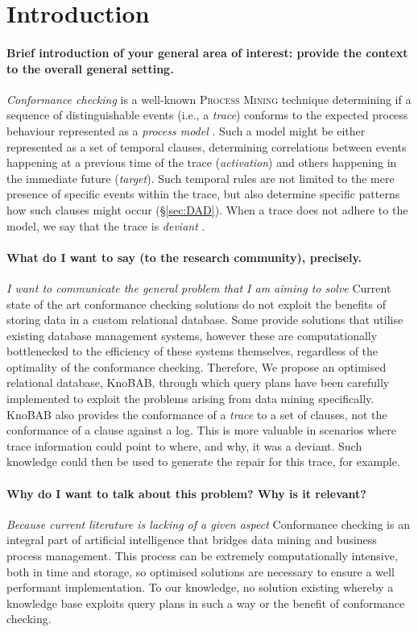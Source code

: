 \section{Introduction}

\paragraph*{Brief introduction of your general area of interest: provide the \textbf{context} to the overall general setting.}
\textit{Conformance checking} is a well-known \textsc{Process Mining} technique determining if a sequence of distinguishable events (i.e., a \textit{trace}) conforms to the expected process behaviour represented as a \textit{process model} \cite{RozinatA08}. Such a model might be either represented as a set of temporal clauses, determining correlations between events happening at a previous time of the trace (\textit{activation}) and others happening in the immediate future (\textit{target}). Such temporal rules are not limited to the mere presence of specific events within the trace, but also determine specific patterns how such clauses might occur (\S\ref{sec:DAD}). When a trace does not adhere to the model, we say that the trace is \textit{deviant} \cite{bpm21}.
\medskip

\paragraph*{What do I want to say (to the research community), precisely.} \textit{I want to communicate the general problem that I am aiming to solve} Current state of the art conformance checking solutions do not exploit the benefits of storing data in a custom relational database. Some provide solutions that utilise existing database management systems, however these are computationally bottlenecked to the efficiency of these systems themselves, regardless of the optimality of the conformance checking. Therefore, We propose an optimised relational database, KnoBAB, through which query plans have been carefully implemented to exploit the problems arising from data mining specifically. KnoBAB also provides the conformance of a \emph{trace} to a set of clauses, not the conformance of a clause against a log. This is more valuable in scenarios where trace information could point to where, and why, it was a deviant. Such knowledge could then be used to generate the repair for this trace, for example.
\medskip

\paragraph*{Why do I want to talk about this problem? Why is it relevant?} \textit{Because current literature is lacking of a given aspect} Conformance checking is an integral part of artificial intelligence that bridges data mining and business process management. This process can be extremely computationally intensive, both in time and storage, so optimised solutions are necessary to ensure a well performant implementation. To our knowledge, no solution existing whereby a knowledge base exploits query plans in such a way or the benefit of conformance checking. 
\medskip

